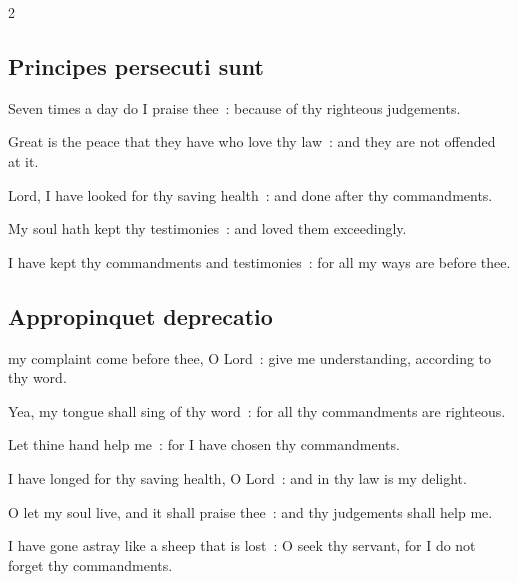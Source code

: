 \begin{multicols}{2}

\subsection{Principes persecuti sunt}


\par
{}
Seven times a day do I praise thee~: because of thy righteous judgements.\par
{}Great is the peace that they have who love thy law~: and they are not offended at it.\par
{}Lord, I have looked for thy saving health~: and done after thy commandments.\par
{}My soul hath kept thy testimonies~: and loved them exceedingly.\par
{}I have kept thy commandments and testimonies~: for all my ways are before thee.\par

\subsection{Appropinquet deprecatio}
 my complaint come before thee, O Lord~: give me under\-stand\-ing, according to thy word.\par
{}
Yea, my tongue shall sing of thy word~: for all thy commandments are righteous.\par
{}Let thine hand help me~: for I have chosen thy commandments.\par
{}I have longed for thy saving health, O Lord~: and in thy law is my delight.\par
{}O let my soul live, and it shall praise thee~: and thy judgements shall help me.\par
{}I have gone astray like a sheep that is lost~: O seek thy servant, for I do not forget thy commandments.\\


\end{multicols}
